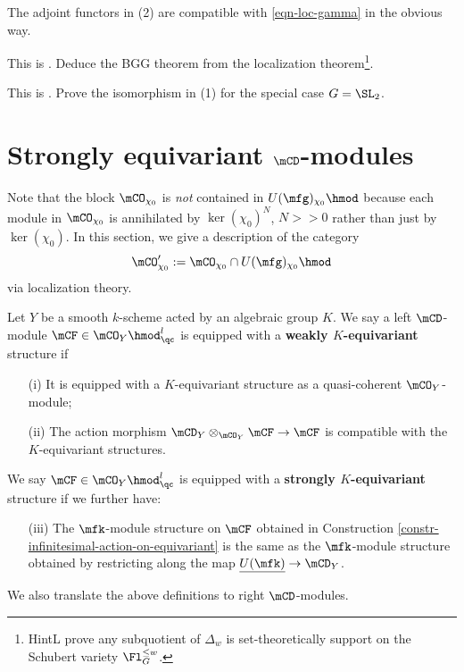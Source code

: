 	\begin{rem}
		The adjoint functors in (2) are compatible with \eqref{eqn-loc-gamma} in the obvious way.
	\end{rem}

	\begin{exe}
		This is . Deduce the BGG theorem from the localization theorem\footnote{HintL prove any subquotient of $\Delta_w$ is set-theoretically support on the Schubert variety $\Fl_G^{\le w}$.}.
	\end{exe}

	\begin{exe}
		This is . Prove the isomorphism in (1) for the special case $G=\SL_2$.
	\end{exe}

\section{Strongly equivariant \texorpdfstring{$\mCD$}{D}-modules}

	Note that the block $\mCO_{\chi_0}$ is \emph{not} contained in $U(\mfg)_{\chi_0}\hmod $ because each module in $\mCO_{\chi_0}$ is annihilated by $\ker(\chi_0)^N$, $N>>0$ rather than just by $\ker(\chi_0)$. In this section, we give a description of the category
	\[
		\mCO_{\chi_0}' := \mCO_{\chi_0} \cap U(\mfg)_{\chi_0}\hmod
	\]
	via localization theory.

	\begin{defn}
		Let $Y$ be a smooth $k$-scheme acted by an algebraic group $K$. We say a left $\mCD$-module $\mCF\in \mCO_Y\hmod_\qc^l$ is equipped with a \textbf{weakly $K$-equivariant} structure if
		\begin{itemize}
			\item[(i)]
				It is equipped with a $K$-equivariant structure as a quasi-coherent $\mCO_Y$-module;
			\item[(ii)]
				The action morphism $\mCD_Y \ot_{\mCO_Y} \mCF \to \mCF$ is compatible with the $K$-equivariant structures.
		\end{itemize}
		We say $\mCF\in \mCO_Y\hmod_\qc^l$ is equipped with a \textbf{strongly $K$-equivariant} structure if we further have:
		\begin{itemize}
			\item[(iii)]
				The $\mfk$-module structure on $\mCF$ obtained in Construction \ref{constr-infinitesimal-action-on-equivariant} is the same as the $\mfk$-module structure obtained by restricting along the map $\underline{U(\mfk)} \to \mCD_Y$.
		\end{itemize}

		We also translate the above definitions to right $\mCD$-modules.
	\end{defn}

